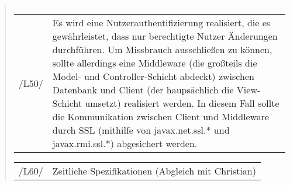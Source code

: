 \begin{quote}
\begin{tabular}{p{1cm}p{12cm}}
\end{tabular}
\begin{tabular}{p{1cm}p{12cm}}
					
	 /L50/	& Es wird eine Nutzerauthentifizierung realisiert, die es gewährleistet, dass nur berechtigte Nutzer Änderungen durchführen. Um Missbrauch ausschließen zu können, sollte allerdings eine Middleware (die großteils die Model- und Controller-Schicht abdeckt) zwischen Datenbank und Client (der haupsächlich die View-Schicht umsetzt) realisiert werden. In diesem Fall sollte die Kommunikation zwischen Client und Middleware durch SSL (mithilfe von javax.net.ssl.* und javax.rmi.ssl.*) abgesichert werden. \\[0.25cm]
	
\end{tabular}
\begin{tabular}{p{1cm}p{12cm}}
					
	 /L60/	& Zeitliche Spezifikationen (Abgleich mit Christian) \\[0.25cm]
	
\end{tabular}
\end{quote}



